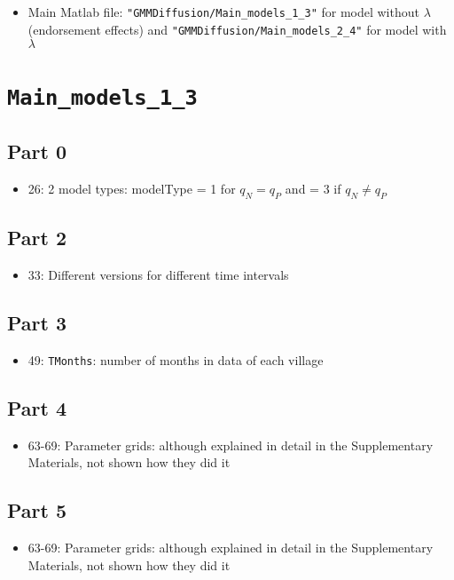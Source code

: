 \documentclass[10pt,letterpaper]{article}
\author{Mizuhiro Suzuki}
\title{}
\begin{document}
\maketitle

\tableofcontents

\section{}

\begin{itemize}
  \item Main Matlab file: \texttt{"GMMDiffusion/Main\_models\_1\_3"} for model without $\lambda$ (endorsement effects) and \texttt{"GMMDiffusion/Main\_models\_2\_4"} for model with $\lambda$
\end{itemize}

\section{\texttt{Main\_models\_1\_3}}

\subsection*{Part 0}
\begin{itemize}
  \item 26: 2 model types: modelType = 1 for $q_N = q_P$ and = 3 if $q_N \ne q_P$
\end{itemize}

\subsection*{Part 2}
\begin{itemize}
  \item 33: Different versions for different time intervals 
\end{itemize}

\subsection*{Part 3}
\begin{itemize}
  \item 49: \texttt{TMonths}: number of months in data of each village
\end{itemize}

\subsection*{Part 4}
\begin{itemize}
  \item 63-69: Parameter grids: although explained in detail in the Supplementary Materials, not shown how they did it
\end{itemize}

\subsection*{Part 5}
\begin{itemize}
  \item 63-69: Parameter grids: although explained in detail in the Supplementary Materials, not shown how they did it
\end{itemize}

\clearpage
%
%
\end{document}
